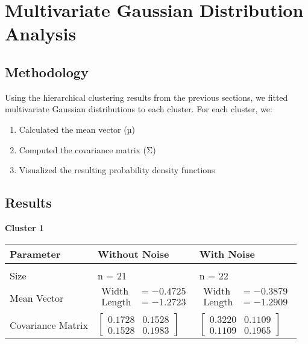 \documentclass[12pt]{article}
\begin{document}
\section{Multivariate Gaussian Distribution Analysis}

\subsection{Methodology}
Using the hierarchical clustering results from the previous sections, we fitted multivariate Gaussian distributions to each cluster. For each cluster, we:
\begin{enumerate}
    \item Calculated the mean vector (µ)
    \item Computed the covariance matrix (Σ)
    \item Visualized the resulting probability density functions
\end{enumerate}
\vspace{2cm}

\subsection{Results}
\noindent\textbf{Cluster 1} \\[0.5cm]
\begin{tabular}{l|l|l}
\textbf{Parameter} & \textbf{Without Noise} & \textbf{With Noise} \\[0.3cm]
\hline \\[0.3cm]
Size & n = 21 & n = 22 \\[0.5cm]
Mean Vector & $\begin{aligned}
\text{Width} &= -0.4725 \\[0.2cm]
\text{Length} &= -1.2723
\end{aligned}$ & 
$\begin{aligned}
\text{Width} &= -0.3879 \\[0.2cm]
\text{Length} &= -1.2909
\end{aligned}$ \\[0.8cm]
Covariance Matrix & $\begin{bmatrix}
0.1728 & 0.1528 \\[0.2cm]
0.1528 & 0.1983
\end{bmatrix}$ & 
$\begin{bmatrix}
0.3220 & 0.1109 \\[0.2cm]
0.1109 & 0.1965
\end{bmatrix}$
\end{tabular}
\end{document}
